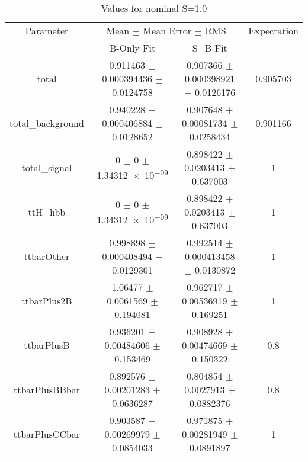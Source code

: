\begin{table}
\centering
\caption{Values for nominal S=1.0}
\begin{tabular}{cccc}
\toprule
Parameter & \multicolumn{2}{c}{Mean $\pm$ Mean Error $\pm$ RMS} & Expectation\\
 & B-Only Fit & S+B Fit & \\
\midrule
total & \num{0.911463} $\pm$ \num{0.000394436} $\pm$ \num{0.0124758} & \num{0.907366} $\pm$ \num{0.000398921} $\pm$ \num{0.0126176} & \num{0.905703}\\
total\_background & \num{0.940228} $\pm$ \num{0.000406884} $\pm$ \num{0.0128652} & \num{0.907648} $\pm$ \num{0.00081734} $\pm$ \num{0.0258434} & \num{0.901166}\\
total\_signal & \num{0} $\pm$ \num{0} $\pm$ \num{1.34312e-09} & \num{0.898422} $\pm$ \num{0.0203413} $\pm$ \num{0.637003} & \num{1}\\
ttH\_hbb & \num{0} $\pm$ \num{0} $\pm$ \num{1.34312e-09} & \num{0.898422} $\pm$ \num{0.0203413} $\pm$ \num{0.637003} & \num{1}\\
ttbarOther & \num{0.998898} $\pm$ \num{0.000408494} $\pm$ \num{0.0129301} & \num{0.992514} $\pm$ \num{0.000413458} $\pm$ \num{0.0130872} & \num{1}\\
ttbarPlus2B & \num{1.06477} $\pm$ \num{0.0061569} $\pm$ \num{0.194081} & \num{0.962717} $\pm$ \num{0.00536919} $\pm$ \num{0.169251} & \num{1}\\
ttbarPlusB & \num{0.936201} $\pm$ \num{0.00484606} $\pm$ \num{0.153469} & \num{0.908928} $\pm$ \num{0.00474669} $\pm$ \num{0.150322} & \num{0.8}\\
ttbarPlusBBbar & \num{0.892576} $\pm$ \num{0.00201283} $\pm$ \num{0.0636287} & \num{0.804854} $\pm$ \num{0.0027913} $\pm$ \num{0.0882376} & \num{0.8}\\
ttbarPlusCCbar & \num{0.903587} $\pm$ \num{0.00269979} $\pm$ \num{0.0854033} & \num{0.971875} $\pm$ \num{0.00281949} $\pm$ \num{0.0891897} & \num{1}\\
\bottomrule
\end{tabular}
\end{table}